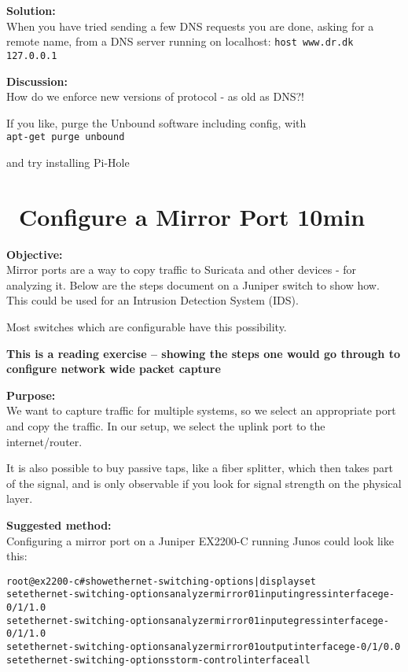 \documentclass[a4paper,11pt,notitlepage]{report}
\begin{document}
{\bf Solution:}\\
When you have tried sending a few DNS requests you are done,  asking for a remote name, from a DNS server running on localhost:
\verb+host www.dr.dk 127.0.0.1+

{\bf Discussion:}\\
How do we enforce new versions of protocol - as old as DNS?!

If you like, purge the Unbound software including config, with\\
\verb+apt-get purge unbound+

and try installing Pi-Hole 

\chapter{\faInfoCircle\ Configure a Mirror Port 10min}
\label{ex:mirrorport}


{\bf Objective:} \\
Mirror ports are a way to copy traffic to Suricata and other devices - for analyzing it. Below are the steps document on a Juniper switch to show how. This could be used for an Intrusion Detection System (IDS).

Most switches which are configurable have this possibility.

{\bf This is a reading exercise -- showing the steps one would go through to configure network wide packet capture}


{\bf Purpose:}\\
We want to capture traffic for multiple systems, so we select an appropriate port and copy the traffic. In our setup, we select the uplink port to the internet/router.

It is also possible to buy passive taps, like a fiber splitter, which then takes part of the signal, and is only observable if you look for signal strength on the physical layer.


{\bf Suggested method:}\\
Configuring a mirror port on a Juniper EX2200-C running Junos could look like this:

\begin{alltt}
root@ex2200-c# show ethernet-switching-options | display set
set ethernet-switching-options analyzer mirror01 input ingress interface ge-0/1/1.0
set ethernet-switching-options analyzer mirror01 input egress interface ge-0/1/1.0
set ethernet-switching-options analyzer mirror01 output interface ge-0/1/0.0
set ethernet-switching-options storm-control interface all
\end{alltt}
\end{document}
